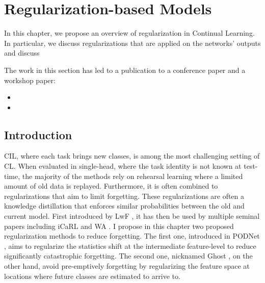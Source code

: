 \chapter{Regularization-based Models}
\label{chapter:regularization}

\newcommand{\pp}{\,\textit{p.p}}
\newcommand{\mypm}{+}


\begin{chapabstract}
    In this chapter, we propose an overview of regularization in Continual Learning. In particular,
    we discuss regularizations that are applied on the networks' outputs and discuss

    The work in this section has led to a publication to a conference paper and a workshop paper:

    \begin{itemize}
        \item {}
        \item {}
    \end{itemize}

\end{chapabstract}


\minitoc
{}


\section{Introduction}

\ac{CIL}, where each task brings new classes, is among the most challenging setting of \ac{CL}. When
evaluated in single-head, where the task identity is not known at test-time, the majority of the
methods rely on rehearsal learning where a limited amount of old data is replayed. Furthermore, it
is often combined to regularizations that aim to limit forgetting. These regularizations are often a
knowledge distillation \citep{hinton2015knowledge_distillation} that enforces similar probabilities
between the old and current model. First introduced by LwF \citep{li2018lwf}, it has then be used by
multiple seminal papers including iCaRL \citep{rebuffi2017icarl} and WA
\citep{zhao2020weightalignement}. I propose in this chapter two proposed regularization methods to
reduce forgetting. The first one, introduced in \ac{PODNet} \citep{douillard2020podnet}, aims to
regularize the statistics shift at the intermediate feature-level to reduce significantly
catastrophic forgetting. The second one, nicknamed Ghost \citep{douillard2020ghost}, on the other
hand, avoid pre-emptively forgetting by regularizing the feature space at locations where future
classes are estimated to arrive to.


